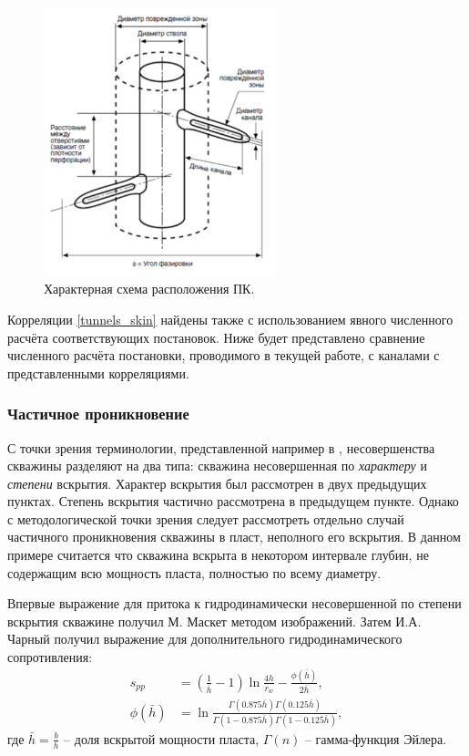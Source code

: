 \begin{figure}[H]
	\label{pic:tunnels}
	\centerline{\includegraphics[width=0.6\textwidth]{pic/tunnels.png}}
	\caption{Характерная схема расположения ПК.}
\end{figure}

	Корреляции \eqref{tunnels_skin} найдены также с использованием явного численного расчёта соответствующих постановок. Ниже будет представлено сравнение численного расчёта постановки, проводимого в текущей работе, с каналами с представленными корреляциями.

\subsubsection{Частичное проникновение}
	
	С точки зрения терминологии, представленной например в \cite{basniev}, несовершенства скважины разделяют на два типа: скважина несовершенная по \textit{характеру} и \textit{степени} вскрытия. Характер вскрытия был рассмотрен в двух предыдущих пунктах. Степень вскрытия частично рассмотрена в предыдущем пункте. Однако с методологической точки зрения следует рассмотреть отдельно случай частичного проникновения скважины в пласт, неполного его вскрытия.
В данном примере считается что скважина вскрыта в некотором интервале глубин, не содержащим всю мощность пласта, полностью по всему диаметру.

	Впервые выражение для притока к гидродинамически несовершенной по степени вскрытия скважине получил М. Маскет \cite{masket} методом изображений.
	Затем И.А. Чарный \cite{charniy} получил выражение для дополнительного гидродинамического сопротивления:
\begin{align}
	\label{skin_part_penetr}
	s_{pp} &= \left(\frac{1}{\bar{h}}-1\right)\ln\frac{4h}{r_w}-\frac{\phi(\bar{h})}{2\bar{h}}, \\
	\phi(\bar{h}) &= \ln\frac{\Gamma(0.875\bar{h})\Gamma(0.125\bar{h})}{\Gamma(1-0.875\bar{h})\Gamma(1-0.125\bar{h})},\nonumber
\end{align}
	где $\bar{h} = \displaystyle\frac{b}{h}$ -- доля вскрытой мощности пласта, $\Gamma(n)$ -- гамма-функция Эйлера.

